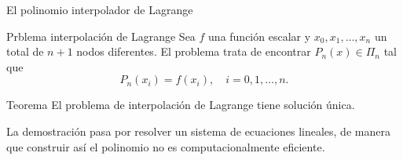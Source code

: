 \begin{frame}{El polinomio interpolador de Lagrange}
  \begin{exampleblock}{Prblema interpolación de Lagrange}
    Sea $f$ una función escalar y $x_0, x_1, \ldots, x_n$ un total de $n +
    1$ nodos diferentes. El problema trata de encontrar $P_n(x) \in \Pi_n$
    tal que
    \[
      P_n(x_i) = f(x_i), \quad i = 0, 1, \ldots, n.
    \]
  \end{exampleblock}

  \begin{alertblock}{Teorema}
    El problema de interpolación de Lagrange tiene solución única.
  \end{alertblock}

  La demostración pasa por resolver un sistema de ecuaciones lineales,
  de manera que construir así el polinomio \alert{no es computacionalmente
  eficiente}.
\end{frame}
